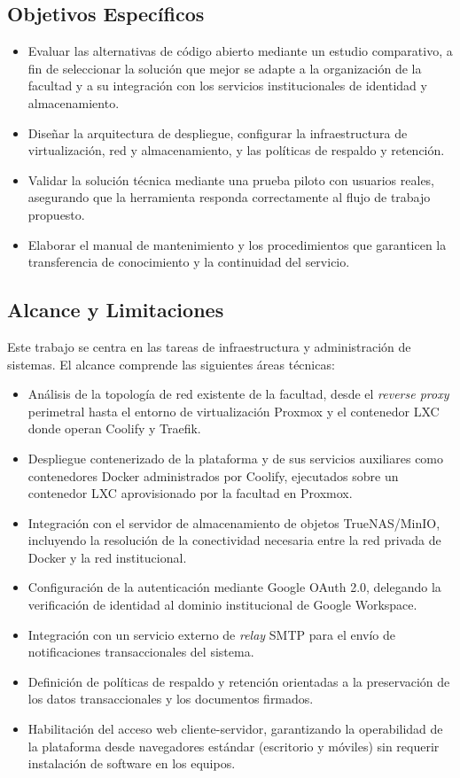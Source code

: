 \subsection{Objetivos Específicos}
\begin{itemize}
    \item Evaluar las alternativas de código abierto mediante un estudio comparativo, a fin de seleccionar la solución que mejor se adapte a la organización de la facultad y a su integración con los servicios institucionales de identidad y almacenamiento.
    \item Diseñar la arquitectura de despliegue, configurar la infraestructura de virtualización, red y almacenamiento, y las políticas de respaldo y retención.
    \item Validar la solución técnica mediante una prueba piloto con usuarios reales, asegurando que la herramienta responda correctamente al flujo de trabajo propuesto.
    \item Elaborar el manual de mantenimiento y los procedimientos que garanticen la transferencia de conocimiento y la continuidad del servicio.
\end{itemize}

\subsection{Alcance y Limitaciones}
Este trabajo se centra en las tareas de infraestructura y administración de sistemas. El alcance comprende las siguientes áreas técnicas:

\begin{itemize}
    \item Análisis de la topología de red existente de la facultad, desde el \textit{reverse proxy} perimetral hasta el entorno de virtualización Proxmox y el contenedor LXC donde operan Coolify y Traefik.
    \item Despliegue contenerizado de la plataforma y de sus servicios auxiliares como contenedores Docker administrados por Coolify, ejecutados sobre un contenedor LXC aprovisionado por la facultad en Proxmox.
    \item Integración con el servidor de almacenamiento de objetos TrueNAS/MinIO, incluyendo la resolución de la conectividad necesaria entre la red privada de Docker y la red institucional.
    \item Configuración de la autenticación mediante Google OAuth 2.0, delegando la verificación de identidad al dominio institucional de Google Workspace.
    \item Integración con un servicio externo de \textit{relay} SMTP para el envío de notificaciones transaccionales del sistema.
    \item Definición de políticas de respaldo y retención orientadas a la preservación de los datos transaccionales y los documentos firmados.
    \item Habilitación del acceso web cliente-servidor, garantizando la operabilidad de la plataforma desde navegadores estándar (escritorio y móviles) sin requerir instalación de software en los equipos.
\end{itemize}

